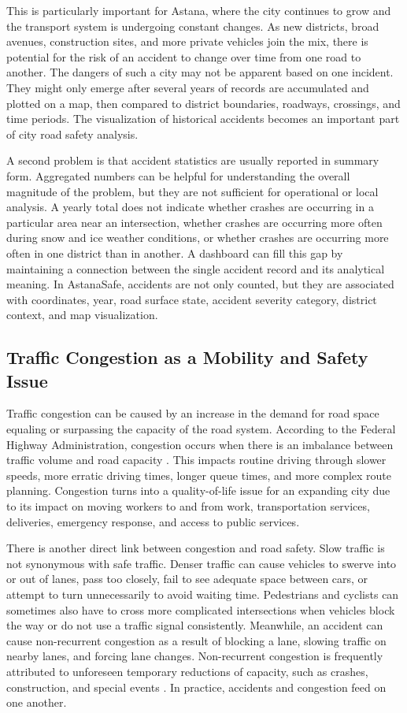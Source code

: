 ﻿\documentclass[12pt,a4paper]{report}
\begin{document}
This is particularly important for Astana, where the city continues to grow and the transport system is undergoing constant changes. As new districts, broad avenues, construction sites, and more private vehicles join the mix, there is potential for the risk of an accident to change over time from one road to another. The dangers of such a city may not be apparent based on one incident. They might only emerge after several years of records are accumulated and plotted on a map, then compared to district boundaries, roadways, crossings, and time periods. The visualization of historical accidents becomes an important part of city road safety analysis.

A second problem is that accident statistics are usually reported in summary form. Aggregated numbers can be helpful for understanding the overall magnitude of the problem, but they are not sufficient for operational or local analysis. A yearly total does not indicate whether crashes are occurring in a particular area near an intersection, whether crashes are occurring more often during snow and ice weather conditions, or whether crashes are occurring more often in one district than in another. A dashboard can fill this gap by maintaining a connection between the single accident record and its analytical meaning. In AstanaSafe, accidents are not only counted, but they are associated with coordinates, year, road surface state, accident severity category, district context, and map visualization.

\subsection{Traffic Congestion as a Mobility and Safety Issue}

Traffic congestion can be caused by an increase in the demand for road space equaling or surpassing the capacity of the road system. According to the Federal Highway Administration, congestion occurs when there is an imbalance between traffic volume and road capacity \cite{fhwa2015}. This impacts routine driving through slower speeds, more erratic driving times, longer queue times, and more complex route planning. Congestion turns into a quality-of-life issue for an expanding city due to its impact on moving workers to and from work, transportation services, deliveries, emergency response, and access to public services.

There is another direct link between congestion and road safety. Slow traffic is not synonymous with safe traffic. Denser traffic can cause vehicles to swerve into or out of lanes, pass too closely, fail to see adequate space between cars, or attempt to turn unnecessarily to avoid waiting time. Pedestrians and cyclists can sometimes also have to cross more complicated intersections when vehicles block the way or do not use a traffic signal consistently. Meanwhile, an accident can cause non-recurrent congestion as a result of blocking a lane, slowing traffic on nearby lanes, and forcing lane changes. Non-recurrent congestion is frequently attributed to unforeseen temporary reductions of capacity, such as crashes, construction, and special events \cite{fhwa2015}. In practice, accidents and congestion feed on one another.
\end{document}
